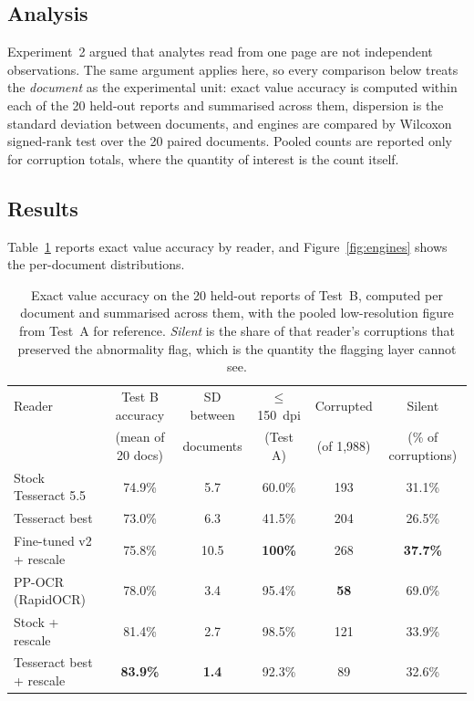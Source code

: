\documentclass[11pt]{article}
\begin{document}
\subsection{Analysis}

Experiment~2 argued that analytes read from one page are not independent observations. The same
argument applies here, so every comparison below treats the \emph{document} as the experimental
unit: exact value accuracy is computed within each of the 20 held-out reports and summarised
across them, dispersion is the standard deviation between documents, and engines are compared by
Wilcoxon signed-rank test over the 20 paired documents. Pooled counts are reported only for
corruption totals, where the quantity of interest is the count itself.

\subsection{Results}

Table~\ref{tab:engines} reports exact value accuracy by reader, and Figure~\ref{fig:engines}
shows the per-document distributions.

\begin{table}[t]
\centering
\caption{Exact value accuracy on the 20 held-out reports of Test~B, computed per document and
summarised across them, with the pooled low-resolution figure from Test~A for reference.
\emph{Silent} is the share of that reader's corruptions that preserved the abnormality flag,
which is the quantity the flagging layer cannot see.}
\label{tab:engines}
\small
\begin{tabular}{lccccc}
\toprule
Reader & Test B accuracy & SD between & $\leq$150~dpi & Corrupted & Silent \\
       & (mean of 20 docs) & documents & (Test A) & (of 1{,}988) & (\% of corruptions) \\
\midrule
Stock Tesseract 5.5      & 74.9\% & \phantom{0}5.7 & 60.0\% & 193 & 31.1\% \\
Tesseract best           & 73.0\% & \phantom{0}6.3 & 41.5\% & 204 & 26.5\% \\
Fine-tuned v2 + rescale  & 75.8\% & 10.5 & \textbf{100\%} & 268 & \textbf{37.7\%} \\
PP-OCR (RapidOCR)        & 78.0\% & \phantom{0}3.4 & 95.4\% & \textbf{\phantom{0}58} & 69.0\% \\
Stock + rescale          & 81.4\% & \phantom{0}2.7 & 98.5\% & 121 & 33.9\% \\
Tesseract best + rescale & \textbf{83.9\%} & \textbf{\phantom{0}1.4} & 92.3\% & \phantom{0}89 & 32.6\% \\
\bottomrule
\end{tabular}
\end{table}
\end{document}
